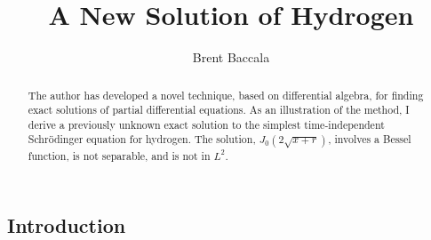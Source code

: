 \documentclass{article}
\title{A New Solution of Hydrogen}
\author{Brent Baccala}
\begin{document}
\parindent 0pt

\maketitle

\begin{abstract}
The author has developed a novel technique, based on differential algebra,
for finding exact solutions of partial
differential equations.  As an illustration of the method,
I derive a previously unknown exact solution to the simplest time-independent Schr\"odinger equation for hydrogen.
The solution, $J_0(2\sqrt{x+r})$, involves a Bessel function, is not separable, and is not in $L^2$.
\end{abstract}

\subsection*{Introduction}
\parskip 12pt

\end{document}
